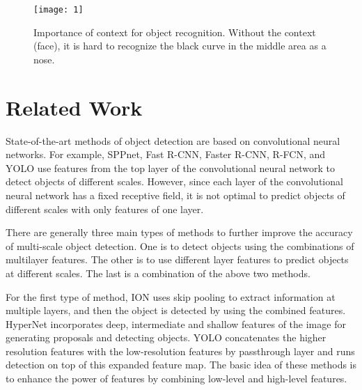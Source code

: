 \documentclass[10pt,twocolumn,letterpaper]{article}
\begin{document}
\begin{figure}
\centering
\texttt{[image: 1]}
\caption{Importance of context for object recognition. Without the context (face), it is hard to recognize the black curve in the middle area as a nose.}
\label{fig:1}
\end{figure}
\section{Related Work}
State-of-the-art methods of object detection are based
on convolutional neural networks. For example, SPPnet, Fast R-CNN, Faster R-CNN, R-FCN, and
YOLO use features from the top layer of the convolutional
neural network to detect objects of different scales.
However, since each layer of the convolutional neural network has a fixed receptive field, it is not optimal to predict
objects of different scales with only features of one layer.

There are generally three main types of methods to further
improve the accuracy of multi-scale object detection.
One is to detect objects using the combinations of multilayer
features. The other is to use different layer features to
predict objects at different scales. The last is a combination
of the above two methods.

For the first type of method, ION uses skip pooling
to extract information at multiple layers, and then the object
is detected by using the combined features. HyperNet incorporates deep, intermediate and shallow features
of the image for generating proposals and detecting objects.
YOLO concatenates the higher resolution features
with the low-resolution features by passthrough layer and
runs detection on top of this expanded feature map. The basic
idea of these methods is to enhance the power of features
by combining low-level and high-level features.



{\small


}
\end{document}
